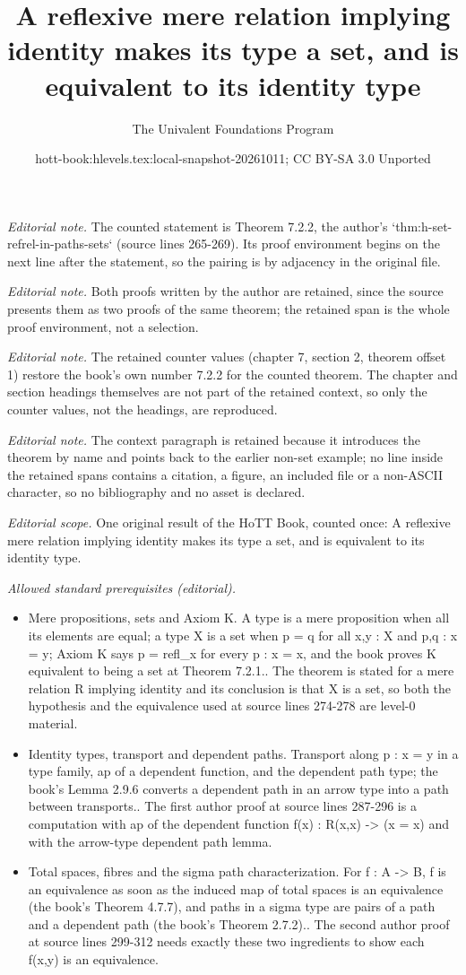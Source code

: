 \documentclass[10pt,a4paper]{article}
\title{A reflexive mere relation implying identity makes its type a set, and is equivalent to its identity type}
\author{The Univalent Foundations Program}
\date{hott-book:hlevels.tex:local-snapshot-20261011; CC BY-SA 3.0 Unported}
\newcounter{chapter}
\theoremstyle{definition}
\theoremstyle{remark}
\numberwithin{equation}{section}
\begin{document}
\maketitle
\setcounter{chapter}{7}
\setcounter{section}{2}
\setcounter{thm}{1}
\noindent\textit{Editorial note.} The counted statement is Theorem 7.2.2, the author's `thm:h-set-refrel-in-paths-sets` (source lines 265-269). Its proof environment begins on the next line after the statement, so the pairing is by adjacency in the original file.\par\medskip
\noindent\textit{Editorial note.} Both proofs written by the author are retained, since the source presents them as two proofs of the same theorem; the retained span is the whole proof environment, not a selection.\par\medskip
\noindent\textit{Editorial note.} The retained counter values (chapter 7, section 2, theorem offset 1) restore the book's own number 7.2.2 for the counted theorem. The chapter and section headings themselves are not part of the retained context, so only the counter values, not the headings, are reproduced.\par\medskip
\noindent\textit{Editorial note.} The context paragraph is retained because it introduces the theorem by name and points back to the earlier non-set example; no line inside the retained spans contains a citation, a figure, an included file or a non-ASCII character, so no bibliography and no asset is declared.\par\medskip
\noindent\textit{Editorial scope.} One original result of the HoTT Book, counted once: A reflexive mere relation implying identity makes its type a set, and is equivalent to its identity type.\par\medskip
\noindent\textit{Allowed standard prerequisites (editorial).}\begin{itemize}
\item Mere propositions, sets and Axiom K. A type is a mere proposition when all its elements are equal; a type X is a set when p = q for all x,y : X and p,q : x = y; Axiom K says p = refl\_x for every p : x = x, and the book proves K equivalent to being a set at Theorem 7.2.1.. The theorem is stated for a mere relation R implying identity and its conclusion is that X is a set, so both the hypothesis and the equivalence used at source lines 274-278 are level-0 material.
\item Identity types, transport and dependent paths. Transport along p : x = y in a type family, ap of a dependent function, and the dependent path type; the book's Lemma 2.9.6 converts a dependent path in an arrow type into a path between transports.. The first author proof at source lines 287-296 is a computation with ap of the dependent function f(x) : R(x,x) -> (x = x) and with the arrow-type dependent path lemma.
\item Total spaces, fibres and the sigma path characterization. For f : A -> B, f is an equivalence as soon as the induced map of total spaces is an equivalence (the book's Theorem 4.7.7), and paths in a sigma type are pairs of a path and a dependent path (the book's Theorem 2.7.2).. The second author proof at source lines 299-312 needs exactly these two ingredients to show each f(x,y) is an equivalence.
\end{itemize}\medskip
\end{document}
